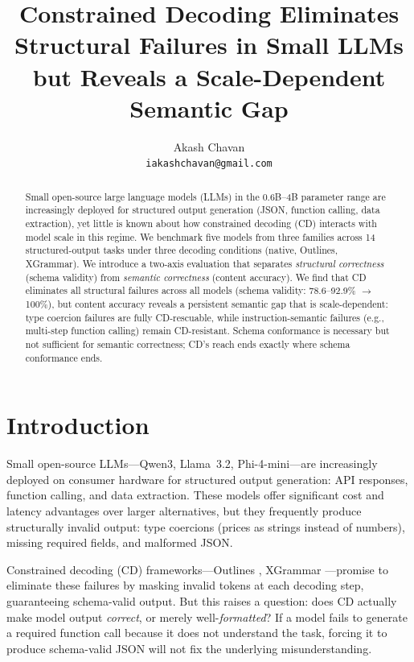 \documentclass[11pt]{article}
\title{Constrained Decoding Eliminates Structural Failures in Small LLMs \\
       but Reveals a Scale-Dependent Semantic Gap}
\author{Akash Chavan \\
        \texttt{iakashchavan@gmail.com}}
\newcommand{\cd}{constrained decoding}
\newcommand{\CD}{Constrained decoding}
\begin{document}
\maketitle

\begin{abstract}
Small open-source large language models (LLMs) in the 0.6B--4B parameter range are increasingly deployed for structured output generation (JSON, function calling, data extraction), yet little is known about how \cd{} (CD) interacts with model scale in this regime.
We benchmark five models from three families across 14 structured-output tasks under three decoding conditions (native, Outlines, XGrammar).
We introduce a two-axis evaluation that separates \emph{structural correctness} (schema validity) from \emph{semantic correctness} (content accuracy).
We find that CD eliminates all structural failures across all models (schema validity: 78.6--92.9\% $\to$ 100\%), but content accuracy reveals a persistent semantic gap that is scale-dependent: type coercion failures are fully CD-rescuable, while instruction-semantic failures (e.g., multi-step function calling) remain CD-resistant.
Schema conformance is necessary but not sufficient for semantic correctness; CD's reach ends exactly where schema conformance ends.
\end{abstract}

\section{Introduction}
\label{sec:intro}

Small open-source LLMs---Qwen3, Llama~3.2, Phi-4-mini---are increasingly deployed on consumer hardware for structured output generation: API responses, function calling, and data extraction.
These models offer significant cost and latency advantages over larger alternatives, but they frequently produce structurally invalid output: type coercions (prices as strings instead of numbers), missing required fields, and malformed JSON.

\CD{} (CD) frameworks---Outlines \citep{willard2023efficient}, XGrammar \citep{dong2024xgrammar}---promise to eliminate these failures by masking invalid tokens at each decoding step, guaranteeing schema-valid output.
But this raises a question: does CD actually make model output \emph{correct}, or merely well-\emph{formatted}?
If a model fails to generate a required function call because it does not understand the task, forcing it to produce schema-valid JSON will not fix the underlying misunderstanding.
\end{document}
